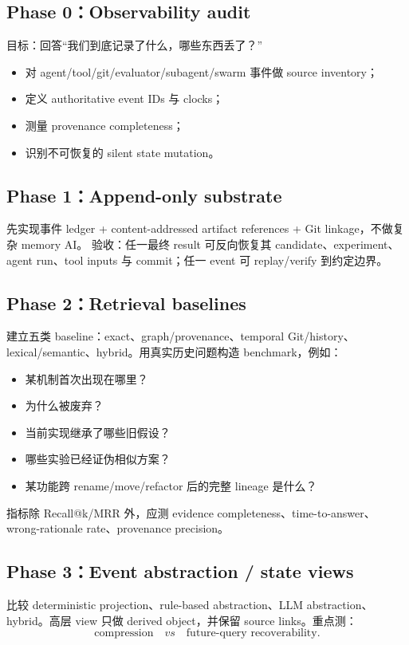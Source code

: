 \documentclass[11pt,a4paper]{ctexart}
\begin{document}
\subsection{Phase 0：Observability audit}
目标：回答“我们到底记录了什么，哪些东西丢了？”
\begin{itemize}
\item 对 agent/tool/git/evaluator/subagent/swarm 事件做 source inventory；
\item 定义 authoritative event IDs 与 clocks；
\item 测量 provenance completeness；
\item 识别不可恢复的 silent state mutation。
\end{itemize}

\subsection{Phase 1：Append-only substrate}
先实现事件 ledger + content-addressed artifact references + Git linkage，不做复杂 memory AI。
验收：任一最终 result 可反向恢复其 candidate、experiment、agent run、tool inputs 与 commit；任一 event 可 replay/verify 到约定边界。

\subsection{Phase 2：Retrieval baselines}
建立五类 baseline：exact、graph/provenance、temporal Git/history、lexical/semantic、hybrid。用真实历史问题构造 benchmark，例如：
\begin{itemize}
\item 某机制首次出现在哪里？
\item 为什么被废弃？
\item 当前实现继承了哪些旧假设？
\item 哪些实验已经证伪相似方案？
\item 某功能跨 rename/move/refactor 后的完整 lineage 是什么？
\end{itemize}
指标除 Recall@k/MRR 外，应测 evidence completeness、time-to-answer、wrong-rationale rate、provenance precision。

\subsection{Phase 3：Event abstraction / state views}
比较 deterministic projection、rule-based abstraction、LLM abstraction、hybrid。高层 view 只做 derived object，并保留 source links。重点测：
\begin{equation}
\text{compression}\quad vs\quad\text{future-query recoverability}.
\end{equation}
\end{document}
